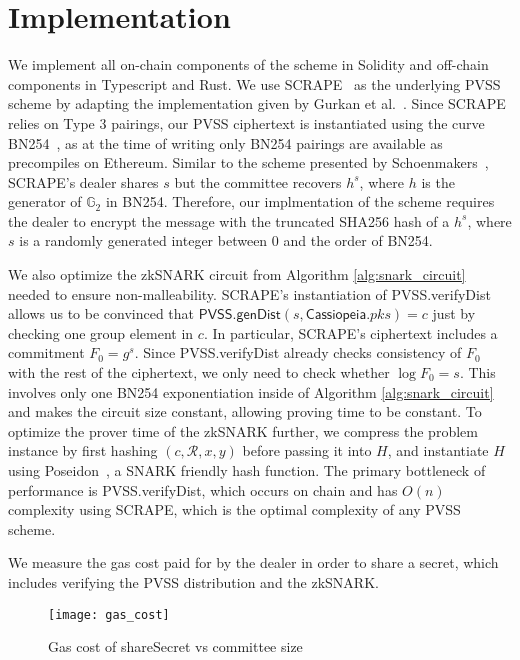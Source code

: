 \section{Implementation}

We implement all on-chain components of the scheme in Solidity and off-chain components in Typescript and Rust.
We use SCRAPE~\cite{pvss_scrape} as the underlying PVSS scheme by adapting the implementation given by Gurkan et al.~\cite{aggregatable_dkg}.
Since SCRAPE relies on Type 3 pairings, our PVSS ciphertext is instantiated using the curve BN254~\cite{bn254}, as at the time of writing only BN254 pairings are available as precompiles on Ethereum.
Similar to the scheme presented by Schoenmakers~\cite{pvss_schoenmakers}, SCRAPE's dealer shares $s$ but the committee recovers $h^s$, where $h$ is the generator of $\mathbb{G}_2$ in BN254.
Therefore, our implmentation of the scheme requires the dealer to encrypt the message with the truncated SHA256 hash of a $h^s$, where $s$ is a randomly generated integer between 0 and the order of BN254.

We also optimize the zkSNARK circuit from Algorithm \ref{alg:snark_circuit} needed to ensure non-malleability.
SCRAPE's instantiation of \textsf{PVSS.verifyDist} allows us to be convinced that $\textsf{PVSS.genDist}(s, \textsf{Cassiopeia}.pks) = c$ just by checking one group element in $c$.
In particular, SCRAPE's ciphertext includes a commitment $F_0 = g^s$.
Since \textsf{PVSS.verifyDist} already checks consistency of $F_0$ with the rest of the ciphertext, we only need to check whether $\log F_0 = s$.
This involves only one BN254 exponentiation inside of Algorithm \ref{alg:snark_circuit} and makes the circuit size constant, allowing proving time to be constant.
To optimize the prover time of the zkSNARK further, we compress the problem instance by first hashing $(c, \mathcal{R}, x, y)$ before passing it into $H$, and instantiate $H$ using Poseidon~\cite{poseidon}, a SNARK friendly hash function.
The primary bottleneck of performance is \textsf{PVSS.verifyDist}, which occurs on chain and has $O(n)$ complexity using SCRAPE, which is the optimal complexity of any PVSS scheme.


We measure the gas cost paid for by the dealer in order to share a secret, which includes verifying the PVSS distribution and the zkSNARK.
\begin{figure}
\caption{Gas cost of \textsf{shareSecret} vs committee size}
\texttt{[image: gas\_cost]}
\end{figure}

